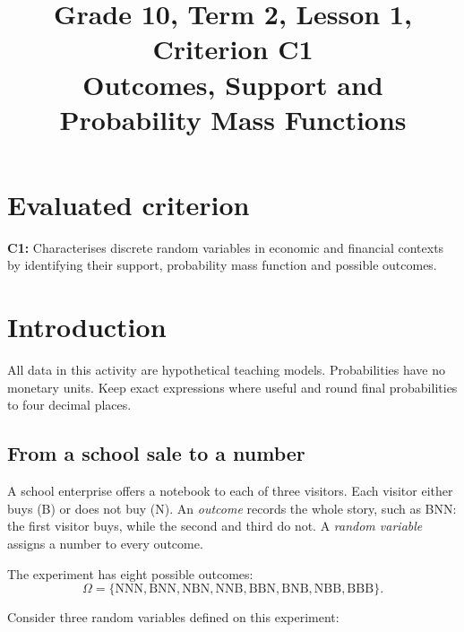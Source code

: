 \makeatletter
{}
\makeatother



\usepackage{needspace}
\setlength{\emergencystretch}{2em}
\title{Grade 10, Term 2, Lesson 1, Criterion C1\\Outcomes, Support and Probability Mass Functions}
\author{}
\date{}

\maketitle
\setcounter{tocdepth}{1}
\setcounter{secnumdepth}{2}
\label{toc}
\tableofcontents
\section*{Evaluated criterion}
\textbf{C1:} Characterises discrete random variables in economic and financial contexts by identifying their support, probability mass function and possible outcomes.
\section{Introduction}\label{sec:t2-c1-introduction}
All data in this activity are hypothetical teaching models. Probabilities have no monetary units. Keep exact expressions where useful and round final probabilities to four decimal places.

\GTenHighlightLegend

\subsection{From a school sale to a number}

A school enterprise offers a notebook to each of three visitors. Each visitor either buys (B) or does not buy (N). An \emph{outcome} records the whole story, such as BNN: the first visitor buys, while the second and third do not. A \emph{random variable} assigns a number to every outcome.

The experiment has eight possible outcomes:
\[
\Omega=\{\mathrm{NNN},\mathrm{BNN},\mathrm{NBN},\mathrm{NNB},
\mathrm{BBN},\mathrm{BNB},\mathrm{NBB},\mathrm{BBB}\}.
\]

Consider three random variables defined on this experiment:

